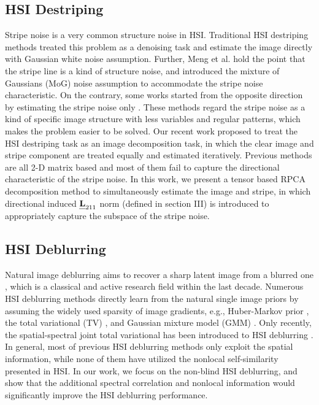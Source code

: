 \documentclass[twocolumn]{svjour3}          %
\begin{document}
   \subsection{HSI Destriping}
   Stripe noise is a very common structure noise in HSI. Traditional HSI destriping methods \cite{shen2009map, bouali2011toward, chang2015anisotropic, lu2013graph, zhang2014hyperspectral} treated this problem as a denoising task and estimate the image directly with Gaussian white noise assumption. Further, Meng et al. \cite{meng2013robust, cao2015low} hold the point that the stripe line is a kind of structure noise, and introduced the mixture of Gaussians (MoG) noise assumption to accommodate the stripe noise characteristic. On the contrary, some works started from the opposite direction by estimating the stripe noise only \cite{carfantan2010statistical, fehrenbach2012variational, liu2015stripe}. These methods regard the stripe noise as a kind of specific image structure with less variables and regular patterns, which makes the problem easier to be solved. Our recent work \cite{chang2016remote} proposed to treat the HSI destriping task as an image decomposition task, in which the clear image and stripe component are treated equally and estimated iteratively. Previous methods are all 2-D matrix based and most of them fail to capture the directional characteristic of the stripe noise. In this work, we present a tensor based RPCA decomposition method to simultaneously estimate the image and stripe, in which directional induced $\textbf{\emph{L}}_{211}$ norm (defined in section III) is introduced to appropriately capture the subspace of the stripe noise.

   \subsection{HSI Deblurring}
    Natural image deblurring aims to recover a sharp latent image from a blurred one \cite{levin2009understanding}, which is a classical and active research field within the last decade. Numerous HSI deblurring methods directly learn from the natural single image priors by assuming the widely used sparsity of image gradients, e.g., Huber-Markov prior \cite{shen2012blind}, the total variational (TV) \cite{zhao2013deblurring}, and Gaussian mixture model (GMM) \cite{zhong2015learning}. Only recently, the spatial-spectral joint total variational has been introduced to HSI deblurring \cite{henrot2013fast, fang2017hyperspectral}. In general, most of previous HSI deblurring methods only exploit the spatial information, while none of them have utilized the nonlocal self-similarity presented in HSI. In our work, we focus on the non-blind HSI deblurring, and show that the additional spectral correlation and nonlocal information would significantly improve the HSI deblurring performance.
\end{document}
